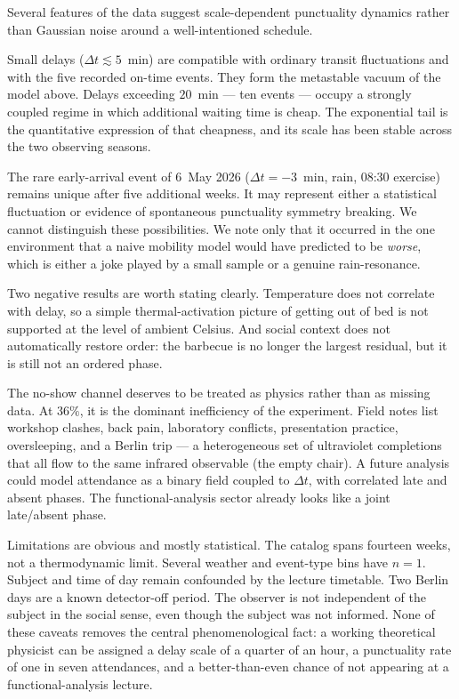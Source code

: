 \documentclass[10pt,twocolumn]{article}
\begin{document}
Several features of the data suggest scale-dependent
punctuality dynamics rather than Gaussian noise around a
well-intentioned schedule.

Small delays ($\Delta t\lesssim 5$~min) are compatible
with ordinary transit fluctuations and with the five recorded
on-time events. They form the metastable vacuum of the model
above. Delays exceeding $20$~min --- ten events --- occupy a
strongly coupled regime in which additional waiting time is
cheap. The exponential tail is the quantitative expression of
that cheapness, and its scale has been stable across the two
observing seasons.

The rare early-arrival event of 6~May 2026
($\Delta t=-3$~min, rain, 08:30 exercise) remains unique
after five additional weeks. It may represent either a
statistical fluctuation or evidence of spontaneous
punctuality symmetry breaking. We cannot distinguish these
possibilities. We note only that it occurred in the one
environment that a naive mobility model would have predicted
to be \emph{worse}, which is either a joke played by a small
sample or a genuine rain-resonance.

Two negative results are worth stating clearly.
Temperature does not correlate with delay, so a simple
thermal-activation picture of getting out of bed is not
supported at the level of ambient Celsius.
And social context does not automatically restore order:
the barbecue is no longer the largest residual, but it
is still not an ordered phase.

The no-show channel deserves to be treated as physics rather
than as missing data. At $36\%$, it is the dominant
inefficiency of the experiment. Field notes list workshop
clashes, back pain, laboratory conflicts, presentation
practice, oversleeping, and a Berlin trip --- a
heterogeneous set of ultraviolet completions that all flow
to the same infrared observable (the empty chair).
A future analysis could model attendance as a binary field
coupled to $\Delta t$, with correlated late and absent
phases. The functional-analysis sector already looks like
a joint late/absent phase.

Limitations are obvious and mostly statistical.
The catalog spans fourteen weeks, not a thermodynamic limit.
Several weather and event-type bins have $n=1$.
Subject and time of day remain confounded by the lecture
timetable. Two Berlin days are a known detector-off period.
The observer is not independent of the subject in the social
sense, even though the subject was not informed.
None of these caveats removes the central phenomenological
fact: a working theoretical physicist can be assigned a
delay scale of a quarter of an hour, a punctuality rate of
one in seven attendances, and a better-than-even chance of
not appearing at a functional-analysis lecture.
\end{document}
